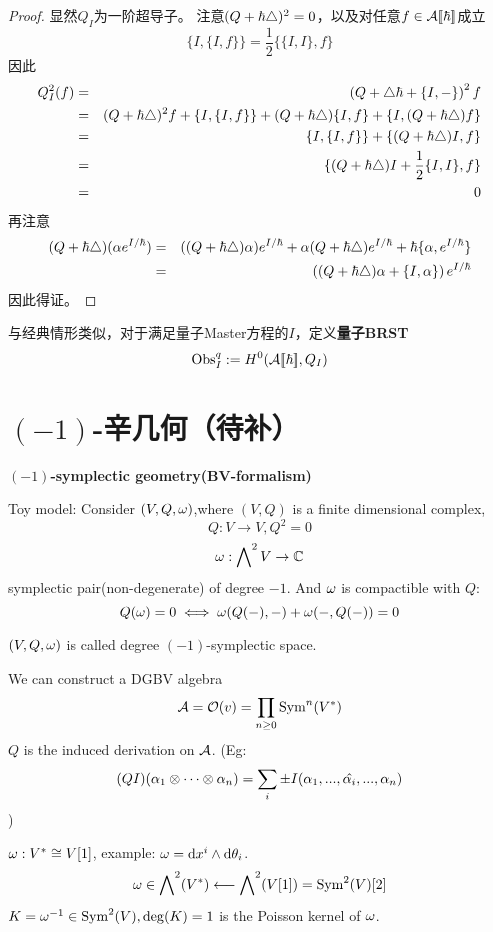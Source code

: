 \begin{proof}显然$Q_I$为一阶超导子。
注意$(Q+\hbar\triangle)^2=0$，以及对任意$f\in\mathcal{A}[\![\hbar]\!]$成立
$$\{I,\{I,f\}\}=\frac{1}{2}\{\{I,I\},f\}$$
因此
\begin{eqnarray*}
     Q_I^2(f)
&=&
     \left(
       Q+\triangle\hbar+\{I,-\}
     \right)^2f\\
&=&
     (Q+\hbar\triangle)^2f+\{I,\{I,f\}\}
    +(Q+\hbar\triangle)\{I,f\}
    +\{I,(Q+\hbar\triangle)f\}\\
&=&
     \{I,\{I,f\}\}
    +\{(Q+\hbar\triangle)I,f\}\\
&=&
     \{(Q+\hbar\triangle)I+\frac{1}{2}\{I,I\},f\}\\
&=&
     0
\end{eqnarray*}
再注意
\begin{eqnarray*}
     (Q+\hbar\triangle)(\alpha e^{I/\hbar})
&=&
     ((Q+\hbar\triangle)\alpha)e^{I/\hbar}
    +\alpha(Q+\hbar\triangle)e^{I/\hbar}
    +\hbar\{\alpha,e^{I/\hbar}\}\\
&=&
     \left(
       (Q+\hbar\triangle)\alpha+\{I,\alpha\}
     \right)e^{I/\hbar}
\end{eqnarray*}
因此得证。
\end{proof}

与经典情形类似，对于满足量子Master方程的$I$，定义\textbf{量子BRST}
$$\operatorname{Obs}^q_I:=H^0(\mathcal{A}[\![\hbar]\!],Q_I)$$


\section{$(-1)$-辛几何（待补）}

\textbf{$(-1)$-symplectic geometry(BV-formalism)}

Toy model:
Consider $(V,Q,\omega)$,where $(V,Q)$ is a finite dimensional complex,
$$Q:V\to V,Q^2=0$$
$$\omega:\bigwedge\nolimits^{2}V\to\mathbb{C}$$
symplectic pair(non-degenerate) of degree $-1$.
And $\omega$ is compactible with $Q$:
$$Q(\omega)=0\iff
\omega(Q(-),-)+\omega(-,Q(-))=0$$

$(V,Q,\omega)$ is called degree $(-1)$-symplectic space.

We can construct a DGBV algebra
$$\mathcal{A}=\mathcal{O}(v)=\prod_{n\geq 0}\operatorname{Sym}^n(V^*)$$
$Q$ is the induced derivation on $\mathcal{A}$.
(Eg:
$$(QI)(\alpha_1\otimes\cdots\otimes\alpha_n)=
\sum_i\pm I(\alpha_1,...,\hat{\alpha_i},...,\alpha_n)$$
)

$\omega:V^*\cong V[1]$, example:
$\omega=\mathrm{d} x^i\wedge\mathrm{d}\theta_i$.
$$\omega\in\bigwedge\nolimits^{2}(V^*)\longleftarrow \bigwedge\nolimits^{2}(V[1])=\operatorname{Sym}^2(V)[2]$$
$K=\omega^{-1}\in\operatorname{Sym}^2(V),\deg(K)=1$ is the Poisson kernel of $\omega$.

